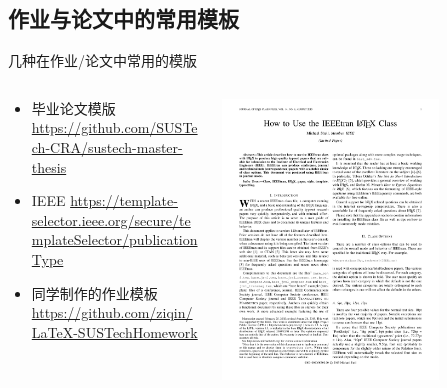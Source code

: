 \subsection{作业与论文中的常用模板}
\begin{frame}{几种在作业/论文中常用的模版}
    \begin{columns}[c]
    \begin{column}{.45\textwidth}
        \begin{itemize}
            \item 毕业论文模版 \url{https://github.com/SUSTech-CRA/sustech-master-thesis}
            \item IEEE \url{https://template-selector.ieee.org/secure/templateSelector/publicationType}
            \item 同学制作的作业模板 \url{https://github.com/ziqin/LaTeX-SUSTechHomework}
        \end{itemize}
    \end{column}
    \begin{column}{.45\textwidth}
        \includegraphics[width=0.75\textwidth]{docs/IEEE_template_1.pdf}
      \end{column}
    \end{columns}
    

\end{frame}

